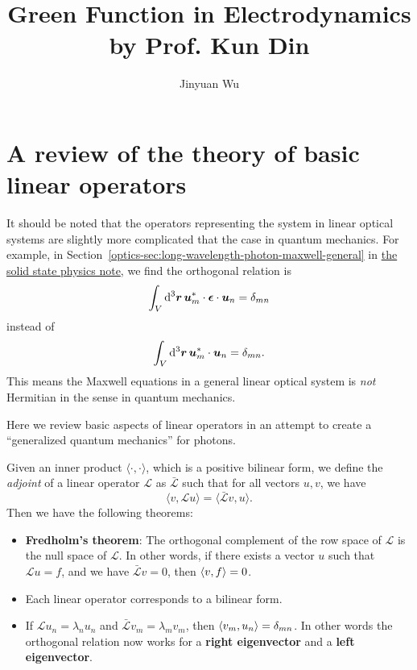 \documentclass[hyperref, a4paper]{article}
\title{Green Function in Electrodynamics by Prof. Kun Din}
\author{Jinyuan Wu}
\newcommand*{\concept}[1]{{\textbf{#1}}}
\newcommand{\opticsddoc}{\href{../optics/optics}{the solid state physics note}}
\begin{document}
\maketitle

\section{A review of the theory of basic linear operators}

It should be noted that the operators representing the system in linear optical systems are slightly more 
complicated that the case in quantum mechanics. For example, 
in Section~\ref{optics-sec:long-wavelength-photon-maxwell-general} in \opticsddoc, 
we find the orthogonal relation is
\[
    \int_V \dd[3]{\vb*{r}} \vb*{u}^*_m \cdot \vb*{\epsilon} \cdot \vb*{u}_n = \delta_{mn}
\]
instead of 
\[
    \int_V \dd[3]{\vb*{r}} \vb*{u}^*_m \cdot \vb*{u}_n = \delta_{mn}.
\]
This means the Maxwell equations in a general linear optical system is \emph{not} Hermitian in the sense in quantum mechanics.

Here we review basic aspects of linear operators in an attempt to create a ``generalized quantum mechanics'' for photons.

Given an inner product $\langle \cdot, \cdot \rangle$, which is a positive bilinear form,
we define the \emph{adjoint} of a linear operator $\mathcal{L}$ as $\bar{\mathcal{L}}$ such that for all vectors $u, v$, we have 
\begin{equation}
    \langle v , \mathcal{L} u \rangle = \langle \bar{\mathcal{L}} v, u \rangle.
\end{equation}
Then we have the following theorems:
\begin{itemize}
    \item \concept{Fredholm's theorem}: The orthogonal complement of the row space of $\mathcal{L}$ is the null space of $\mathcal{L}$.
    In other words, if there exists a vector $u$ such that $\mathcal{L} u = f$, and we have $\bar{\mathcal{L}} v = 0$, 
    then $\expval{v, f} = 0$.
    \item Each linear operator corresponds to a bilinear form.
    \item If $\mathcal{L} u_n = \lambda_n u_n$ and $\bar{\mathcal{L}} v_m = \lambda_m v_m$, then $\expval{v_m, u_n} = \delta_{mn}$.
    In other words the orthogonal relation now works for a \concept{right eigenvector} and a \concept{left eigenvector}.
\end{itemize}
\end{document}
